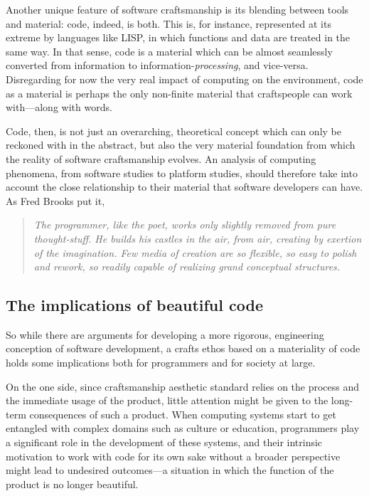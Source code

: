\documentclass{article}
\begin{document}
Another unique feature of software craftsmanship is its blending between tools and material: code, indeed, is both. This is, for instance, represented at its extreme by languages like LISP, in which functions and data are treated in the same way\cite{mccarthy_lisp_1965}. In that sense, code is a material which can be almost seamlessly converted from information to information-\emph{processing}, and vice-versa. Disregarding for now the very real impact of computing on the environment\cite{kurp_green_2008}, code as a material is perhaps the only non-finite material that craftspeople can work with---along with words.

Code, then, is not just an overarching, theoretical concept which can only be reckoned with in the abstract, but also the very material foundation from which the reality of software craftsmanship evolves. An analysis of computing phenomena, from software studies to platform studies, should therefore take into account the close relationship to their material that software developers can have. As Fred Brooks put it,

\begin{quote}
    \textit{The programmer, like the poet, works only slightly removed from pure thought-stuff. He builds his castles in the air, from air, creating by exertion of the imagination. Few media of creation are so flexible, so easy to polish and rework, so readily capable of realizing grand conceptual structures.\cite{brooks_mythical_1975}}
\end{quote}

\subsection{The implications of beautiful code}

So while there are arguments for developing a more rigorous, engineering conception of software development\cite{ensmenger_computer_2012}, a crafts ethos based on a materiality of code holds some implications both for programmers and for society at large.

On the one side, since craftsmanship aesthetic standard relies on the process and the immediate usage of the product, little attention might be given to the long-term consequences of such a product. When computing systems start to get entangled with complex domains such as culture\cite{seaver_captivating_2019} or education\cite{perrotta_programming_2020}, programmers play a significant role in the development of these systems\cite{levy_programmation_1992}, and their intrinsic motivation to work with code for its own sake without a broader perspective might lead to undesired outcomes---a situation in which the function of the product is no longer beautiful.
\end{document}
